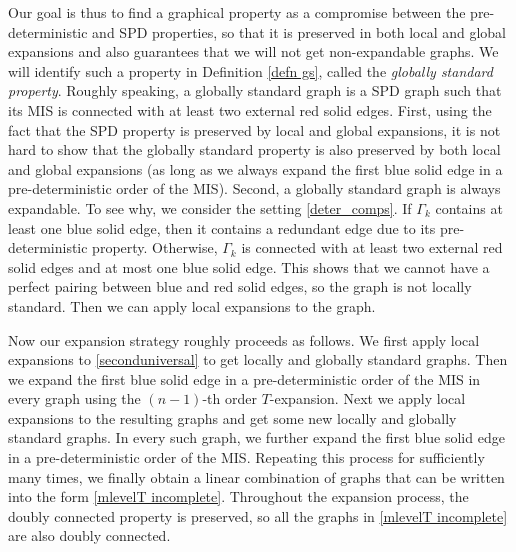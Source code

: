 \documentclass{article}
\newcommand{\1}{\mathds{1}}
\numberwithin{equation}{section}
\theoremstyle{plain} %
\theoremstyle{remark}
\begin{document}
Our goal is thus to find a graphical property as a compromise between the pre-deterministic and SPD properties, so that it is preserved in both local and global expansions and also guarantees that we will not get non-expandable graphs. We will identify such a property in Definition \ref{defn gs}, called the \emph{globally standard property}. Roughly speaking, a globally standard graph is a SPD graph such that its MIS is connected with at least two external red solid edges.  First, using the fact that the SPD property is preserved by local and global expansions, %
it is not hard to show that the globally standard property is also preserved by both local and global expansions (as long as we always expand the first blue solid edge in a pre-deterministic order of the MIS). Second, a globally standard graph is always expandable. To see why, we consider the setting \eqref{deter_comps}. If $\Gamma_k$ contains at least one blue solid edge, then it contains a redundant edge due to its pre-deterministic property. Otherwise, $\Gamma_k$ is connected with at least two external red solid edges and at most one blue solid edge. 
This shows that we cannot have a perfect pairing between blue and red solid edges, so the graph is not locally standard. Then we can apply local expansions to the graph. 


Now our expansion strategy roughly proceeds as follows. We first apply local expansions to \eqref{seconduniversal} to get locally and globally standard graphs. Then we expand the first blue solid edge in a pre-deterministic order of the MIS in every graph using 
the $(n-1)$-th order $T$-expansion. Next we apply local expansions to the resulting graphs and get some new locally and globally standard graphs. In every such graph, we further expand the first blue solid edge in a pre-deterministic order of the MIS. Repeating this process for sufficiently many times, we finally obtain a linear combination of graphs that can be written into the form \eqref{mlevelT incomplete}. Throughout the expansion process, the doubly connected property is preserved, so all the graphs in \eqref{mlevelT incomplete} are also doubly connected. 
\end{document}
